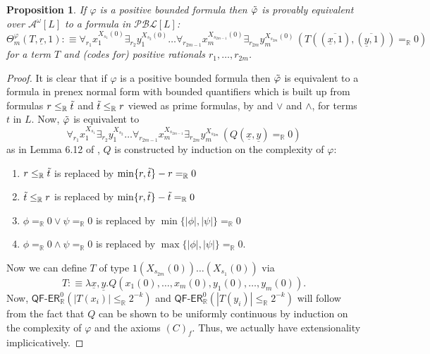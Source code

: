 \documentclass[11pt]{amsart}
\newtheorem{proposition}[theorem]{Proposition}
\theoremstyle{definition}
\theoremstyle{remark}
\def\RR{\mathbb{R}}
\newcommand{\QFER}{\textsf{QF}\mbox{-}\textsf{ER}}
\begin{document}
\begin{proposition}
\label{prop:equiv:pbl:prenex}
    If $\varphi$ is a positive bounded formula then $\Tilde{\varphi}$ is provably equivalent over $\mathcal{A}^\omega[L]$ to a formula in $\mathcal{PBL}[L]$:
      \[
  \Theta_m^{\varphi}(T,\underline{r},1):\equiv\forall_{r_1} x_1^{X_{s_1}(0)} \exists_{r_2} y_1^{X_{s_2}(0)} \ldots \forall_{r_{2m-1}} x_m^{X_{s_{2m-1}}(0)}\exists_{r_{2m}} y_m^{X_{s_{2m}}(0)}\,(T((\overline{\underline{x},1}),(\overline{\underline{y},1}))=_\RR 0)
\]
for a term $T$ and (codes for) positive rationals $r_1,\ldots,r_{2m}$.
\end{proposition}
\begin{proof}
It is clear that if $\varphi$ is a positive bounded formula then $\Tilde{\varphi}$ is equivalent to a formula in prenex normal form with bounded quantifiers which is built up
from formulas $r\le_\RR \Tilde{t}$  and $\Tilde{t} \le_\RR r$ viewed as prime formulas, by and $\lor$ and $\land$, for terms $t$ in $L$. Now, $\Tilde{\varphi}$ is equivalent to 
\[
\forall_{r_1} x_1^{X_{s_1}} \exists_{r_2} y_1^{X_{s_2}} \ldots \forall_{r_{2m-1}} x_m^{X_{s_{2m-1}}}\exists_{r_{2m}} y_m^{X_{s_{2m}}}\,(Q(\underline{x},\underline{y})=_\RR 0)
\]
as in Lemma 6.12 of \cite{GuK2016}, $Q$ is constructed by induction on the complexity of $\varphi$:
\begin{enumerate}
    \item $r\le_\RR \Tilde{t}$  is replaced by $\min\{r,\Tilde{t}\}-r=_\RR 0$
    \item $\Tilde{t}\le_\RR r$  is replaced by $\min\{r,\Tilde{t}\}-\Tilde{t}=_\RR 0$
    \item $\phi =_\RR 0 \lor \psi =_\RR 0$ is replaced by $\min\{|\phi|,|\psi|\}=_\RR 0$
    \item $\phi =_\RR 0 \land \psi =_\RR 0$ is replaced by $\max\{|\phi|,|\psi|\}=_\RR 0$.
\end{enumerate}
Now we can define $T$ of type $1(X_{s_{2m}}(0))\ldots(X_{s_{1}}(0))$ via 
\[
T:\equiv \lambda \underline{x},\underline{y}. Q(x_1(0),\ldots, x_m(0),y_1(0),\ldots,y_m(0)).
\]
Now, $\QFER^0_\RR(|T(x_i)| \le_\RR  2^{-k})$ and $\QFER^0_\RR(|T(y_i)|\le_\RR  2^{-k})$ will follow from the fact that $Q$ can be shown to be uniformly continuous by induction on the complexity of $\varphi$ and the axioms $(C)_f$. Thus, we actually have extensionality implicicatively.
\end{proof}
\end{document}
